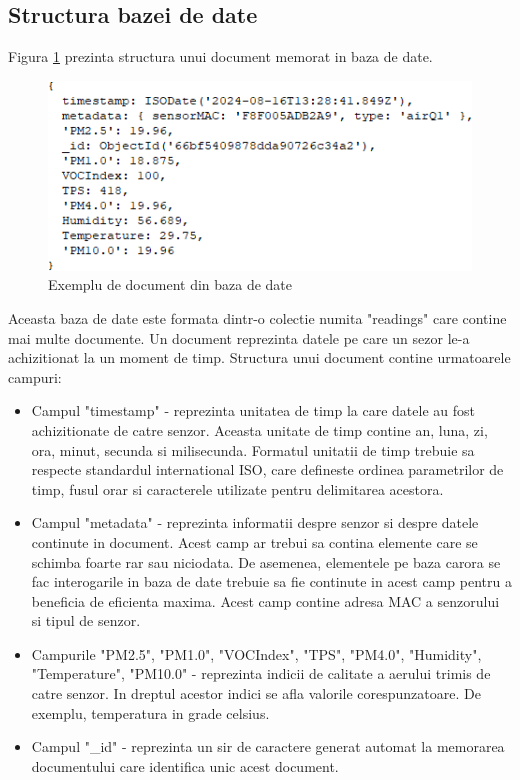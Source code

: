 \subsection{Structura bazei de date}\label{subsec:pi_bazadedate_structura}
Figura \ref{fig:PI_MongodbDocExample} prezinta structura unui document memorat in baza de date. 
\begin{figure}[H]
    \centering
    \includegraphics[scale=0.8]{figs/PI_MongodbDocExample.png}
    \caption{Exemplu de document din baza de date}
    \label{fig:PI_MongodbDocExample}
\end{figure}

Aceasta baza de date este formata dintr-o colectie numita "readings" care contine mai multe documente. Un document reprezinta datele pe care un sezor le-a achizitionat 
la un moment de timp. Structura unui document contine urmatoarele campuri:
\begin{itemize}
	\item Campul "timestamp" - reprezinta unitatea de timp la care datele au fost achizitionate de catre senzor. Aceasta unitate de timp contine an, luna, zi, ora, 
	minut, secunda si milisecunda. Formatul unitatii de timp trebuie sa respecte standardul international ISO, care defineste ordinea parametrilor de timp, 
    fusul orar si caracterele utilizate pentru delimitarea acestora.
	\item Campul "metadata" - reprezinta informatii despre senzor si despre datele continute in document. Acest camp ar trebui sa contina elemente care se schimba 
	foarte rar sau niciodata. De asemenea, elementele pe baza carora se fac interogarile in baza de date trebuie sa fie continute in acest camp pentru a beneficia 
    de eficienta maxima. Acest camp contine adresa MAC a senzorului si tipul de senzor. 
	\item Campurile "PM2.5", "PM1.0", "VOCIndex", "TPS", "PM4.0", "Humidity", "Temperature", "PM10.0" - reprezinta indicii de calitate a aerului trimis de catre senzor.  
    In dreptul acestor indici se afla valorile corespunzatoare. De exemplu, temperatura in grade celsius.
	\item Campul "\_id" - reprezinta un sir de caractere generat automat la memorarea documentului care identifica unic acest document.
\end{itemize}

